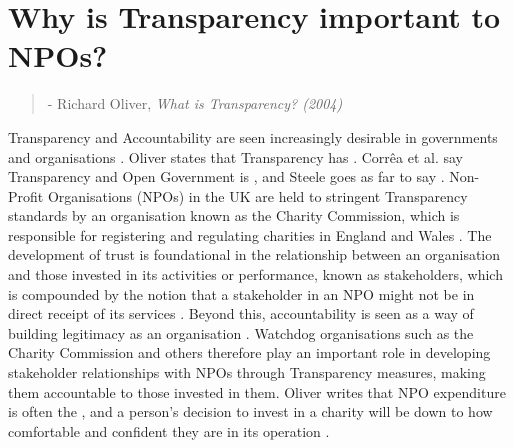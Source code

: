 \section{Why is Transparency important to NPOs?}

%
\begin{quote}
 - Richard Oliver, \textit{What is Transparency? (2004)}
\end{quote}
%
Transparency and Accountability are seen increasingly desirable in governments and organisations \cite{hood_accountability_2010, oliver_what_2004, heald_fiscal_2003}. Oliver states that Transparency has  \cite{oliver_what_2004}.  Corr\^ea et al. say Transparency and Open Government is  \cite{correa_really_2014}, and Steele goes as far to say  \cite{steele_open-source_2012}.
%
Non-Profit Organisations (NPOs) in the UK are held to stringent Transparency standards by an organisation known as the Charity Commission, which is responsible for registering and regulating charities in England and Wales  \cite{hm_government_charity_????}. The development of trust is foundational in the relationship between an organisation and those invested in its activities or performance, known as stakeholders, which is compounded by the notion that a stakeholder in an NPO might not be in direct receipt of its services \cite{macmillan_relationship_2005, krashinsky_stakeholder_1997}. Beyond this, accountability is seen as a way of building legitimacy as an organisation \cite{anheier_accountability_2009}. Watchdog organisations such as the Charity Commission and others therefore play an important role in developing stakeholder relationships with NPOs through Transparency measures, making them accountable to those invested in them. Oliver writes that NPO expenditure is often the , and a person's decision to invest in a charity will be down to how comfortable and confident they are in its operation \cite{oliver_what_2004}.
